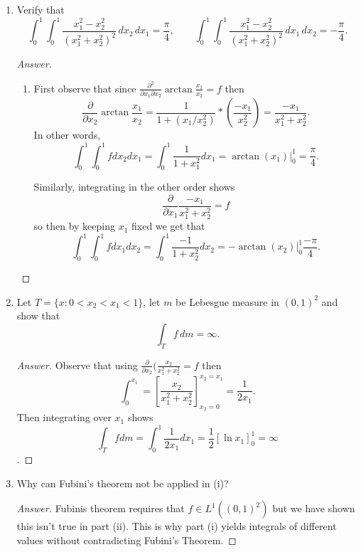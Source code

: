 \documentclass[12pt]{article}
\newenvironment{answer}{\begin{proof}[Answer]}{\end{proof}}
\begin{document}
\begin{enumerate}[label=(\roman*)]
	\item Verify that
	      \[
		      \int_0^1\!\int_0^1 \frac{x_1^2 - x_2^2}{(x_1^2 + x_2^2)^2}\,dx_2\,dx_1 = \frac{\pi}{4}, \qquad
		      \int_0^1\!\int_0^1 \frac{x_1^2 - x_2^2}{(x_1^2 + x_2^2)^2}\,dx_1\,dx_2 = -\frac{\pi}{4}.
	      \]

	      \begin{answer}
		      \begin{enumerate}
			      \item First observe that since $\frac{\partial^2}{\partial x_1 \partial x_2}\arctan \frac{x_1}{x_2} = f$ then $$\frac{\partial}{\partial x_2} \arctan \frac{x_1}{x_2} = \frac{1}{1 + (x_1/x_2^2)} * (\frac{-x_1}{x_2^2}) = \frac{-x_1}{x_1^2+x_2^2}.$$
			            In other words,
			            $$\int_0^1 \int_0^1 f dx_2 dx_1 = \int_0^1 \frac{1}{1+x_1^2} dx_1 = \arctan(x_1)|_0^1 = \frac{\pi}{4}.$$

			            Similarly, integrating in the other order shows
			            $$\frac{\partial}{\partial x_1} \frac{-x_1}{x_1^2 + x_2^2} = f$$ so then
			            by keeping $x_1$ fixed we get that
			            $$\int_0^1 \int_0^1 f dx_1 dx_2 = \int_0^1 \frac{-1}{1+ x_2^2} dx_2 = -\arctan(x_2)|_0^1\frac{-\pi}{4}.$$
		      \end{enumerate}
	      \end{answer}

	\item Let $T = \{x : 0 < x_2 < x_1 < 1\}$, let $m$ be Lebesgue measure in $(0,1)^2$ and show that
	      \[
		      \int_T f\,dm = \infty.
	      \]

	      \begin{answer}
		      Observe that using $\frac{\partial}{\partial x_2}(\frac{x_2}{x_1^2+x_2^2} = f$ then
		      $$\int_0^{x_1} = [\frac{x_2}{x_1^2+x_2^2}]_{x_2 = 0}^{x_2=x_1} = \frac{1}{2x_1}.$$
		      Then integrating over $x_1$ shows
		      $$\int_T f dm = \int_0^1 \frac{1}{2x_1}dx_1 = \frac{1}{2}[\ln x_1]_0^1 = \infty$$.
	      \end{answer}

	\item Why can Fubini's theorem not be applied in (i)?

	      \begin{answer}
		      Fubinis theorem requires that $f\in L^1((0,1)^2)$ but we have shown this isn't true in part (ii). This is why part (i) yields integrals of different values without contradicting Fubini's Theorem.
	      \end{answer}
\end{enumerate}
\end{document}
